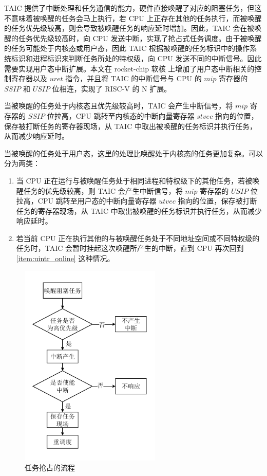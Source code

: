 TAIC 提供了中断处理和任务通信的能力，硬件直接唤醒了对应的阻塞任务，但这不意味着被唤醒的任务会马上执行，若 CPU 上正存在其他的任务执行，而被唤醒的任务优先级较高，则会导致被唤醒任务的响应延时增加。因此，TAIC 会在被唤醒的任务优先级较高时，向 CPU 发送中断，实现了抢占式任务调度。由于被唤醒的任务可能处于内核态或用户态，因此 TAIC 根据被唤醒的任务标识中的操作系统标识和进程标识来判断任务所处的特权级，向 CPU 发送不同的中断信号。因此需要实现用户态中断扩展。本文在 rocket-chip 软核 \cite{rocket-chip} 上增加了用户态中断相关的控制寄存器以及 $uret$ 指令，并且将 TAIC 的中断信号与 CPU 的 $mip$ 寄存器的 $SSIP$ 和 $USIP$ 位相连，实现了 RISC-V 的 N 扩展。

当被唤醒的任务处于内核态且优先级较高时，TAIC 会产生中断信号，将 $mip$ 寄存器的 $SSIP$ 位拉高，CPU 跳转至内核态的中断向量寄存器 $stvec$ 指向的位置，保存被打断任务的寄存器现场，从 TAIC 中取出被唤醒的任务标识并执行任务，从而减少响应延时。

当被唤醒的任务处于用户态，这里的处理比唤醒处于内核态的任务更加复杂。可以分为两类：

\begin{enumerate}
  \item \label{item:uintr_online} 当 CPU 正在运行与被唤醒任务处于相同进程和特权级下的其他任务，若被唤醒任务的优先级较高，则 TAIC 会产生中断信号，将 $mip$ 寄存器的 $USIP$ 位拉高，CPU 跳转至用户态的中断向量寄存器 $utvec$ 指向的位置，保存被打断任务的寄存器现场，从 TAIC 中取出被唤醒的任务标识并执行任务，从而减少响应延时。
  \item 若当前 CPU 正在执行其他的与被唤醒任务处于不同地址空间或不同特权级的任务时，TAIC 会暂时挂起这次唤醒所产生的中断，直到 CPU 再次回到 \ref{item:uintr_online} 这种情况。
\end{enumerate}

\begin{figure}[htbp]
  \centering
  \includegraphics[width=0.6\textwidth]{figures/pdfs/userintr.pdf}
  \caption{任务抢占的流程}
  \label{figure:userintr}
\end{figure}

